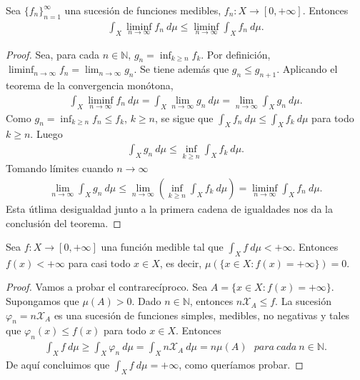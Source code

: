 \begin{teo}
Sea $\{f_n\}_{n=1}^{\infty}$ una sucesión de funciones medibles, $f_n: X \longrightarrow [0,+\infty]$. Entonces
\begin{align*}
    \int_{X}{\liminf_{n \to \infty}{f_n} \ d\mu} \leq \liminf_{n \to \infty}{\int_{X}{f_n \ d\mu}}.
\end{align*}
\end{teo}

\begin{proof}
Sea, para cada $n \in \mathbb{N}$, $g_n = \inf_{k \ge n}{f_k}$. Por definición, $\liminf_{n \to \infty}{f_n} = \lim_{n \to \infty}{g_n}$. Se tiene además que $g_n \leq g_{n+1}$. Aplicando el teorema de la convergencia monótona,
\begin{align*}
    \int_{X}{\liminf_{n \to \infty}{f_n \ d\mu}} = \int_{X}{\lim_{n \to \infty}{g_n \ d\mu}} = \lim_{n \to \infty}{\int_{X}{g_n \ d\mu}}. 
\end{align*}
Como $g_n = \inf_{k \ge n}{f_n} \leq f_k$, $k \ge n$, se sigue que $\int_{X}{f_n \ d\mu} \leq \int_{X}{f_k \ d\mu}$ para todo $k \ge n$. Luego
\begin{align*}
    \int_{X}{g_n \ d\mu} \leq \inf_{k \ge n}{\int_{X}{f_k \ d\mu}}.
\end{align*}
Tomando límites cuando $n \to \infty$
\begin{align*}
    \lim_{n \to \infty}{\int_{X}{g_n \ d\mu}} \leq \lim_{n \to \infty}{\left( \inf_{k \ge n}{\int_{X}{f_k \ d\mu}} \right)} = \liminf_{n \to \infty}{\int_{X}{f_n \ d\mu}}.
\end{align*}
Esta útlima desigualdad junto a la primera cadena de igualdades nos da la conclusión del teorema.
\end{proof}

\begin{prop}
Sea $f: X \longrightarrow [0,+\infty]$ una función medible tal que $\int_{X}{f \ d\mu} < +\infty$. Entonces $f(x) < +\infty$ para casi todo $x \in X$, es decir, $\mu(\{ x \in X : f(x) = +\infty\}) = 0$.
\end{prop}

\begin{proof}
Vamos a probar el contrarecíproco. Sea $A = \{ x \in X : f(x) = +\infty\}$. Supongamos que $\mu(A) > 0$. Dado $n \in \mathbb{N}$, entonces $n \mathcal{X}_A \leq f$. La sucesión $\varphi_n = n \mathcal{X}_A$ es una sucesión de funciones simples, medibles, no negativas y tales que $\varphi_n(x) \leq f(x)$ para todo $x \in X$. Entonces
\begin{align*}
    \int_{X}{f \ d\mu} \ge \int_{X}{\varphi_n \ d\mu} = \int_{X}{n \mathcal{X}_A \ d\mu} = n\mu(A) \ \ \ para \ cada \ n \in \mathbb{N}.
\end{align*}
De aquí concluimos que $\int_{X}{f \ d\mu} = +\infty$, como queríamos probar.
\end{proof}

